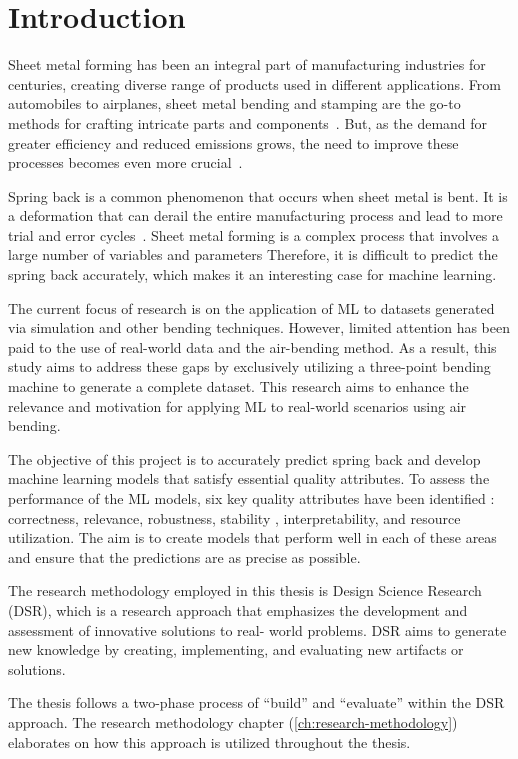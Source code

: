 \chapter{Introduction}\label{ch:introduction}

Sheet metal forming has been an integral part of manufacturing industries for centuries, creating
diverse range of products used in different applications.
From automobiles to airplanes, sheet metal bending and stamping are the go-to methods for
crafting intricate parts and components~\cite[p. 1]{cruz_applicationmachinelearning_2021}.
But, as the demand for greater efficiency and reduced emissions grows, the need to improve these
processes becomes even more crucial~\cite[p. 4]{zheng_reviewformingtechniques_2018}.

Spring back is a common phenomenon that occurs when sheet metal is bent.
It is a deformation that can derail the entire manufacturing process and lead to more trial and
error cycles~\cite[p. 1]{cruz_applicationmachinelearning_2021}.
Sheet metal forming is a complex process that involves a large number of variables and
parameters Therefore, it is difficult to predict the spring back accurately, which
makes it an interesting case for machine learning.

The current focus of research is on the application of \ac{ML} to datasets generated via
simulation and other bending techniques.
However, limited attention has been paid to the use of real-world data and the air-bending method.
As a result, this study aims to address these gaps by exclusively utilizing a three-point bending
machine to generate a complete dataset.
This research aims to enhance the relevance and motivation for applying \ac{ML} to real-world
scenarios using air bending.

The objective of this project is to accurately predict spring back and develop machine learning
models that satisfy essential quality attributes.
To assess the performance of the \ac{ML} models, six key quality attributes have been identified
: correctness, relevance, robustness, stability
, interpretability, and resource utilization.
The aim is to create models that perform well in each of these areas and ensure that the predictions
are as precise as possible.

The research methodology employed in this thesis is Design Science Research (DSR), which is a
research approach that emphasizes the development and assessment of innovative solutions to real-
world problems.
DSR aims to generate new knowledge by creating, implementing, and evaluating new artifacts or
solutions.

The thesis follows a two-phase process of ``build'' and ``evaluate'' within the DSR approach.
The research methodology chapter (\ref{ch:research-methodology}) elaborates on how this approach is
utilized throughout the thesis.